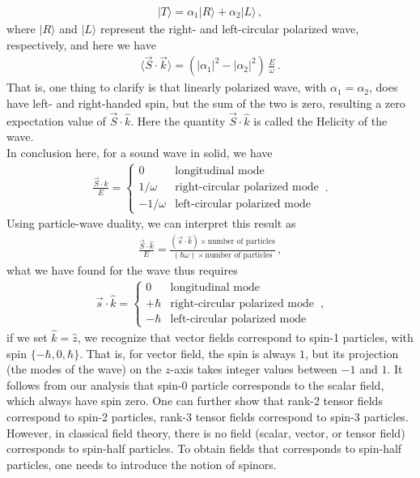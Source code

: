 \documentclass[11pt, onesided]{book}
\theoremstyle{break}
\theoremstyle{break}
\begin{document}
\begin{align*}
|T\rangle = \alpha_1 |R\rangle + \alpha_2 | L\rangle\,,
\end{align*}
where $|R\rangle$ and $|L\rangle$ represent the right- and left-circular polarized wave, respectively, and here we have
\begin{align*}
\langle \vec{S}\cdot \vec{k}\rangle = \left(|\alpha_1|^2  - |\alpha_2|^2\right)\, \frac{E}{\omega} \,.
\end{align*}
That is, one thing to clarify is that linearly polarized wave, with $\alpha_1 = \alpha_2$, does have left- and right-handed spin, but the sum of the two is zero, resulting a zero expectation value of $ \vec{S}\cdot \hat{k}$. Here the quantity $\vec{S}\cdot \hat{k}$ is called the Helicity of the wave. \\

In conclusion here, for a sound wave in solid, we have
\begin{align*}
\frac{\vec{S}\cdot \hat{k}}{E} = 
\begin{cases}
0 & \text{longitudinal mode}\\
1/\omega  & \text{right-circular polarized mode}\\
-1/\omega & \text{left-circular polarized mode}
\end{cases}\,.
\end{align*}
Using particle-wave duality, we can interpret this result as
\begin{align*}
\frac{\vec{S}\cdot \hat{k}}{E} = \frac{(\vec{s}\cdot \hat{k})\times \text{number of particles}}{(\hbar \omega)\times \text{number of particles}}\,,
\end{align*}
what we have found for the wave thus requires
\begin{align*}
\vec{s}\cdot \hat{k} = \begin{cases}
0 & \text{longitudinal mode}\\
+\hbar & \text{right-circular polarized mode}\\
-\hbar & \text{left-circular polarized mode}
\end{cases}\,,
\end{align*}
if we set $\hat{k} = \hat{z}$, we recognize that vector fields correspond to spin-1 particles, with spin $\{-\hbar, 0,\hbar\}$. That is, for vector field, the spin is always $1$, but its projection (the modes of the wave) on the $z$-axis takes integer values between $-1$ and $1$. It follows from our analysis that spin-0 particle corresponds to the scalar field, which always have spin zero. One can further show that rank-2 tensor fields correspond to spin-2 particles, rank-3 tensor fields correspond to spin-3 particles. However, in classical field theory, there is no field (scalar, vector, or tensor field) corresponds to spin-half particles. To obtain fields that corresponds to spin-half particles, one needs to introduce the notion of spinors.\\
\end{document}
